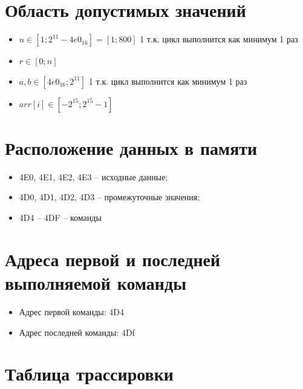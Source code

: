 \documentclass{article}
\begin{document}
\section{Область допустимых значений}

\begin{itemize}
  \item $ n \in [1;  2^{11} - 4e0_{16}] = [1; 800] $ 1 т.к. цикл выполнится как минимум 1 раз  
  \item $ r \in [0;  n] $
  \item $ a, b \in [4e0_{16};  2^{11}] $ 1 т.к. цикл выполнится как минимум 1 раз  
  \item $arr[i] \in [-2^{15}; 2^{15}-1]$
\end{itemize}

\section{Расположение данных в памяти}

\begin{itemize}
  \item 4E0, 4E1, 4E2, 4E3 – исходные данные;
  \item  4D0, 4D1, 4D2, 4D3 – промежуточные значения;
  \item  4D4 – 4DF – команды
\end{itemize}

\section{Адреса первой и последней выполняемой команды}

\begin{itemize}
  \item Адрес первой команды: 4D4
  \item Адрес последней команды: 4Df
\end{itemize}
\section{Таблица трассировки}
\end{document}

